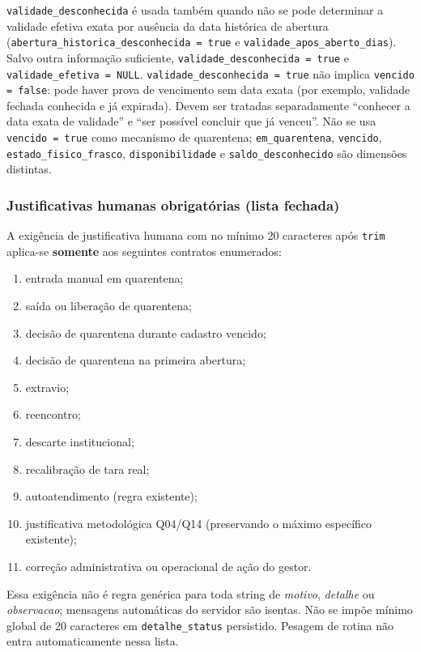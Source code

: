 \begin{regra}
\texttt{validade\_desconhecida} é usada também quando não se pode determinar a validade efetiva exata por ausência da data histórica de abertura (\texttt{abertura\_historica\_desconhecida = true} e \texttt{validade\_apos\_aberto\_dias}). Salvo outra informação suficiente, \texttt{validade\_desconhecida = true} e \texttt{validade\_efetiva = NULL}. \texttt{validade\_desconhecida = true} não implica \texttt{vencido = false}: pode haver prova de vencimento sem data exata (por exemplo, validade fechada conhecida e já expirada). Devem ser tratadas separadamente ``conhecer a data exata de validade'' e ``ser possível concluir que já venceu''. Não se usa \texttt{vencido = true} como mecanismo de quarentena; \texttt{em\_quarentena}, \texttt{vencido}, \texttt{estado\_fisico\_frasco}, \texttt{disponibilidade} e \texttt{saldo\_desconhecido} são dimensões distintas.
\end{regra}

\subsubsection{Justificativas humanas obrigatórias (lista fechada)}
\begin{regra}
A exigência de justificativa humana com no mínimo 20 caracteres após \texttt{trim} aplica-se \textbf{somente} aos seguintes contratos enumerados:
\begin{enumerate}
    \item entrada manual em quarentena;
    \item saída ou liberação de quarentena;
    \item decisão de quarentena durante cadastro vencido;
    \item decisão de quarentena na primeira abertura;
    \item extravio;
    \item reencontro;
    \item descarte institucional;
    \item recalibração de tara real;
    \item autoatendimento (regra existente);
    \item justificativa metodológica Q04/Q14 (preservando o máximo específico existente);
    \item correção administrativa ou operacional de ação do gestor.
\end{enumerate}
Essa exigência não é regra genérica para toda string de \textit{motivo}, \textit{detalhe} ou \textit{observacao}; mensagens automáticas do servidor são isentas. Não se impõe mínimo global de 20 caracteres em \texttt{detalhe\_status} persistido. Pesagem de rotina não entra automaticamente nessa lista.
\end{regra}


